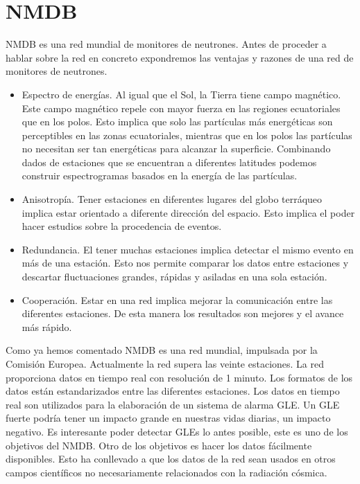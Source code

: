 \section{NMDB}
	NMDB\cite{NMDB2011} es una red mundial de monitores de neutrones. Antes de proceder a hablar sobre la red en concreto expondremos las ventajas
	y razones de una red de monitores de neutrones.
	\begin{itemize}
		\item 	Espectro de energías. Al igual que el Sol, la Tierra tiene campo magnético. Este campo magnético repele con mayor fuerza en
		  	las regiones ecuatoriales que en los polos. Esto implica que solo las partículas más energéticas son perceptibles en las
			zonas ecuatoriales, mientras que en los polos las partículas no necesitan ser tan energéticas para alcanzar la superficie.
			Combinando dados de estaciones que se encuentran a diferentes latitudes podemos construir espectrogramas basados en la energía
			de las partículas.
		\item 	Anisotropía. Tener estaciones en diferentes lugares del globo terráqueo implica estar orientado a diferente dirección del
		  	espacio. Esto implica el poder hacer estudios sobre la procedencia de eventos.
		\item 	Redundancia. El tener muchas estaciones implica detectar el mismo evento en más de una estación. Esto nos permite comparar
		  	los datos entre estaciones y descartar fluctuaciones grandes, rápidas y asiladas en una sola estación.
		\item 	Cooperación. Estar en una red implica mejorar la comunicación entre las diferentes estaciones. De esta manera los resultados
		  	son mejores y el avance más rápido. 
	\end{itemize}
	Como ya hemos comentado NMDB es una red mundial, impulsada por la Comisión Europea. Actualmente la red supera las veinte estaciones. La red
	proporciona datos en tiempo real con resolución de 1 minuto. Los formatos de los datos están estandarizados entre las diferentes estaciones.
	Los datos en tiempo real son utilizados para la elaboración de un sistema de alarma GLE\cite{GleAlarm}. Un GLE fuerte podría tener un impacto
	grande en nuestras vidas diarias, un impacto negativo. Es interesante poder detectar GLEs lo antes posible, este es uno de los objetivos del
	NMDB.  Otro de los objetivos es hacer los datos fácilmente disponibles. Esto ha conllevado a que los datos de la red sean usados en otros
	campos científicos no necesariamente relacionados con la radiación cósmica. 

